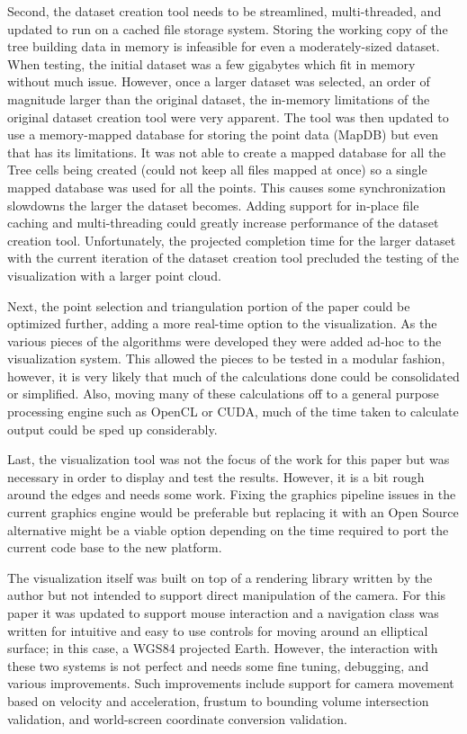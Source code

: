 Second, the dataset creation tool needs to be streamlined, multi-threaded, and
updated to run on a cached file storage system. Storing the working copy of the
tree building data in memory is infeasible for even a moderately-sized dataset.
When testing, the initial dataset was a few gigabytes which fit in memory
without much issue. However, once a larger dataset was selected, an order of
magnitude larger than the original dataset, the in-memory limitations of the
original dataset creation tool were very apparent. The tool was then updated to
use a memory-mapped database for storing the point data (MapDB) but even that
has its limitations. It was not able to create a mapped database for all the
Tree cells being created (could not keep all files mapped at once) so a single
mapped database was used for all the points. This causes some synchronization
slowdowns the larger the dataset becomes. Adding support for in-place file
caching and multi-threading could greatly increase performance of the dataset
creation tool. Unfortunately, the projected completion time for the larger
dataset with the current iteration of the dataset creation tool precluded the
testing of the visualization with a larger point cloud.

Next, the point selection and triangulation portion of the paper could be
optimized further, adding a more real-time option to the visualization. As the
various pieces of the algorithms were developed they were added ad-hoc to the
visualization system. This allowed the pieces to be tested in a modular fashion,
however, it is very likely that much of the calculations done could be
consolidated or simplified. Also, moving many of these calculations off to a
general purpose processing engine such as OpenCL or CUDA, much of the time taken
to calculate output could be sped up considerably.

Last, the visualization tool was not the focus of the work for this paper but
was necessary in order to display and test the results. However, it is a bit
rough around the edges and needs some work. Fixing the graphics pipeline issues
in the current graphics engine would be preferable but replacing it with an Open
Source alternative might be a viable option depending on the time required to
port the current code base to the new platform.

The visualization itself was built on top of a rendering library written by the
author but not intended to support direct manipulation of the camera. For this
paper it was updated to support mouse interaction and a navigation class was
written for intuitive and easy to use controls for moving around an elliptical
surface; in this case, a WGS84 projected Earth. However, the interaction with
these two systems is not perfect and needs some fine tuning, debugging, and
various improvements. Such improvements include support for camera movement
based on velocity and acceleration, frustum to bounding volume intersection
validation, and world-screen coordinate conversion validation.
